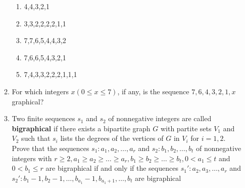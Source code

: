 \documentclass[letterpaper]{article}
\begin{document}
\begin{enumerate}
\begin{enumerate}
  \begin{enumerate}
  \item
  4,4,3,2,1
  \item
  3,3,2,2,2,2,1,1
  \item
  7,7,6,5,4,4,3,2
  \item
  7,6,6,5,4,3,2,1
  \item
  7,4,3,3,2,2,2,1,1,1
  \end{enumerate}
  \setcounter{enumii}{9}
  \item
  For which integers $x (0\le x\le 7)$, if any, is the sequence $7,6,4,3,2,1,x$ graphical?
  \setcounter{enumii}{14}
  \item
  Two finite sequences $s_1$ and $s_2$ of nonnegative integers are called {\bfseries bigraphical} if there exists a bipartite graph $G$ with partite sets $V_1$ and $V_2$ such that $s_i$ lists the degrees of the vertices of $G$ in $V_i$ for $i=1,2$. Prove that the sequences $s_1:a_1,a_2,\dots,a_r$ and $s_2:b_1,b_2,\dots,b_t$ of nonnegative integers with $r\ge 2, a_1\ge a_2\ge\dots\ge a_r, b_1\ge b_2\ge\dots\ge b_t, 0<a_1\le t$ and $0<b_1\le r$ are bigraphical if and only if the sequences $s_1':a_2,a_3,\dots,a_r$ and $s_2':b_1-1,b_2-1,\dots,b_{a_1}-1,b_{a_1+1},\dots,b_t$ are bigraphical
  \end{enumerate}
\end{enumerate}
\end{document}
